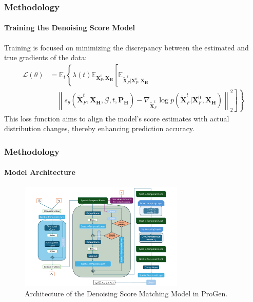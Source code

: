 \documentclass[light]{lutbeamer} %
\begin{document}
\begin{frame}
    \frametitle{Methodology}
    \framesubtitle{Training the Denoising Score Model}

    Training is focused on minimizing the discrepancy between the estimated and true gradients of the data:
    \begin{equation}
        \begin{aligned}
            \mathcal{L}(\theta) & = \mathbb{E}_{t} \left\{ \lambda(t) \mathbb{E}_{\mathbf{X}_{F}^0, \mathbf{X_H}} \left[ \mathbb{E}_{\tilde{\mathbf{X}}_{F}^t | \mathbf{X}_{F}^0, \mathbf{X_H}} \right. \right.                                                                  \\
                                & \quad \left. \left. \left\| s_\theta(\tilde{\mathbf{X}}_{F}^t, \mathbf{X_H}, \mathcal{G}, t, \mathbf{P_H}) - \nabla_{\tilde{\mathbf{X}}_{F}^t} \log p(\tilde{\mathbf{X}}_{F}^t | \mathbf{X}_{F}^0, \mathbf{X_H}) \right\|_2^2 \right] \right\}
        \end{aligned}
        \label{eq:loss}
    \end{equation}
    This loss function aims to align the model's score estimates with actual distribution changes, thereby enhancing prediction accuracy.
\end{frame}

\begin{frame}
    \frametitle{Methodology}
    \framesubtitle{Model Architecture}
    \vspace{-1em}
    \begin{figure}[ht]
        \centering
        \includegraphics[width=0.7\textwidth]{figures/ProGen_model.pdf}
        \vspace{-0.7em}
        \caption{Architecture of the Denoising Score Matching Model in ProGen.}
        \label{fig:model}
    \end{figure}
\end{frame}
\end{document}
